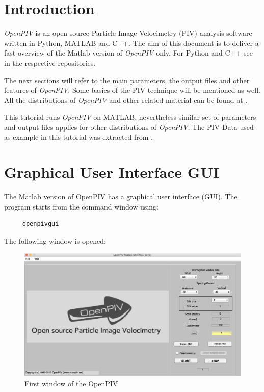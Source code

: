 \section{Introduction}\label{Intro}

\emph{OpenPIV} is an open source Particle Image Velocimetry (PIV) analysis software written in 
Python, MATLAB and C++. The aim of this document is to deliver a fast overview of the Matlab version of \emph{OpenPIV} only. For Python and C++ see in the respective repositories.
 
The next sections will refer to the main parameters, the output files and other features 
of \emph{OpenPIV}. Some basics of the PIV technique will be mentioned as well. All the distributions  of \emph{OpenPIV} and other related material can be found at \cite{Liberzon:2009,Taylor:2010}.


This tutorial runs \emph{OpenPIV} on MATLAB, nevertheless similar set of parameters and output files applies for other distributions  of \emph{OpenPIV}. The PIV-Data used as example in this tutorial was extracted from \cite{carlier_2005}.

\section{Graphical User Interface GUI}\label{GUI}

The Matlab version of OpenPIV has a graphical user interface (GUI). The program starts from the command window using:



\begin{lstlisting}
	 openpivgui
\end{lstlisting}



The following window is opened:
\begin{figure}[H]
	\centering
	\includegraphics[width=\textwidth]{Images/open_window.png}
	\caption{First window of the OpenPIV}
	\label{fig:open_window}
\end{figure}

